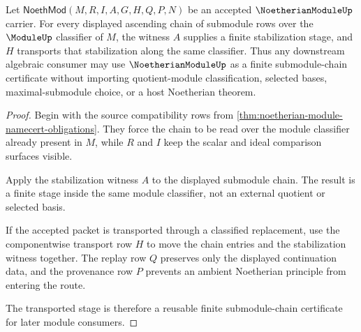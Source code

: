 \begin{theorem}\label{thm:noetherian-module-submodule-chain-stability}
Let $\mathsf{NoethMod}(M,R,I,A,G,H,Q,P,N)$ be an accepted $\NoetherianModuleUp$ carrier. For every displayed ascending chain of submodule rows over the $\ModuleUp$ classifier of $M$, the witness $A$ supplies a finite stabilization stage, and $H$ transports that stabilization along the same classifier. Thus any downstream algebraic consumer may use $\NoetherianModuleUp$ as a finite submodule-chain certificate without importing quotient-module classification, selected bases, maximal-submodule choice, or a host Noetherian theorem.
\end{theorem}
\begin{proof}
Begin with the source compatibility rows from \autoref{thm:noetherian-module-namecert-obligations}. They force the chain to be read over the module classifier already present in $M$, while $R$ and $I$ keep the scalar and ideal comparison surfaces visible.

Apply the stabilization witness $A$ to the displayed submodule chain. The result is a finite stage inside the same module classifier, not an external quotient or selected basis.

If the accepted packet is transported through a classified replacement, use the componentwise transport row $H$ to move the chain entries and the stabilization witness together. The replay row $Q$ preserves only the displayed continuation data, and the provenance row $P$ prevents an ambient Noetherian principle from entering the route.

The transported stage is therefore a reusable finite submodule-chain certificate for later module consumers.
\end{proof}


\begin{closurestatus}{\NoetherianModuleUp}
  \theoryclosure{\seedClosure}
  \formalstatus{\unformalizedV}
\end{closurestatus}
